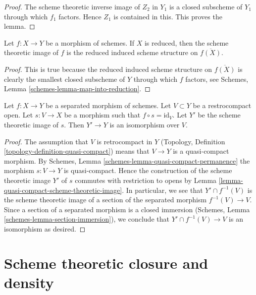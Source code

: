\begin{proof}
The scheme theoretic inverse image of $Z_2$ in $Y_1$
is a closed subscheme of $Y_1$ through
which $f_1$ factors. Hence $Z_1$ is contained in this.
This proves the lemma.
\end{proof}

\begin{lemma}
\label{lemma-scheme-theoretic-image-reduced}
Let $f : X \to Y$ be a morphism of schemes.
If $X$ is reduced, then the scheme theoretic image of $f$ is
the reduced induced scheme structure on $\overline{f(X)}$.
\end{lemma}

\begin{proof}
This is true because the reduced induced scheme structure on $\overline{f(X)}$
is clearly the smallest closed subscheme of $Y$ through which $f$ factors,
see
Schemes, Lemma \ref{schemes-lemma-map-into-reduction}.
\end{proof}

\begin{lemma}
\label{lemma-scheme-theoretic-image-of-partial-section}
Let $f : X \to Y$ be a separated morphism of schemes.
Let $V \subset Y$ be a restrocompact open. Let $s : V \to X$
be a morphism such that $f \circ s = \text{id}_V$.
Let $Y'$ be the scheme theoretic image of $s$.
Then $Y' \to Y$ is an isomorphism over $V$.
\end{lemma}

\begin{proof}
The assumption that $V$ is retrocompact in $Y$
(Topology, Definition \ref{topology-definition-quasi-compact})
means that $V \to Y$ is a quasi-compact morphism.
By Schemes, Lemma \ref{schemes-lemma-quasi-compact-permanence}
the morphism $s : V \to Y$ is quasi-compact.
Hence the construction of the scheme theoretic image $Y'$
of $s$ commutes with restriction to opens by
Lemma \ref{lemma-quasi-compact-scheme-theoretic-image}.
In particular, we see that $Y' \cap f^{-1}(V)$ is the
scheme theoretic image of a section of the separated
morphism $f^{-1}(V) \to V$. Since a section of a separated
morphism is a closed immersion
(Schemes, Lemma \ref{schemes-lemma-section-immersion}),
we conclude that
$Y' \cap f^{-1}(V) \to V$ is an isomorphism as desired.
\end{proof}







\section{Scheme theoretic closure and density}
\label{section-scheme-theoretic-closure}

